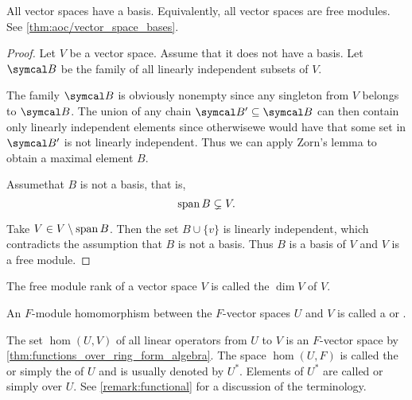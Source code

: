 \begin{theorem}\label{thm:all_vector_spaces_are_free_modules}
  All vector spaces have a basis. Equivalently, all vector spaces are free modules. See \cref{thm:aoc/vector_space_bases}.
\end{theorem}
\begin{proof}
  Let \( V \) be a vector space. Assume that it does not have a basis. Let \( \Cal{B} \) be the family of all linearly independent subsets of \( V \).

  The family \( \Cal{B} \) is obviously nonempty since any singleton from \( V \) belongs to \( \Cal{B} \). The union of any chain \( \Cal{B}' \subseteq \Cal{B} \) can then contain only linearly independent elements since otherwise\LEM we would have that some set in \( \Cal{B}' \) is not linearly independent. Thus we can apply Zorn's lemma to obtain a maximal element \( B \).

  Assume\LEM that \( B \) is not a basis, that is,
  \begin{equation*}
    \operatorname{span} B \subsetneq V.
  \end{equation*}

  Take \( V \in V \setminus \operatorname{span} B \). Then the set \( B \cup \{ v \} \) is linearly independent, which contradicts the assumption that \( B \) is not a basis. Thus \( B \) is a basis of \( V \) and \( V \) is a free module.
\end{proof}

\begin{definition}\label{def:vector_space_dimension}
  The free module rank of a vector space \( V \) is called the  \( \dim V \) of \( V \).
\end{definition}

\begin{definition}\label{def:linear_operator}
  An \( F \)-module homomorphism between the \( F \)-vector spaces \( U \) and \( V \) is called a  or .

  The set \( \hom(U, V) \) of all linear operators from \( U \) to \( V \) is an \( F \)-vector space by \cref{thm:functions_over_ring_form_algebra}. The space
  \( \hom(U, F) \) is called the  or simply the  of \( U \) and is usually denoted by \( U^* \). Elements of \( U^* \) are called  or simply  over \( U \). See \cref{remark:functional} for a discussion of the terminology.
\end{definition}

